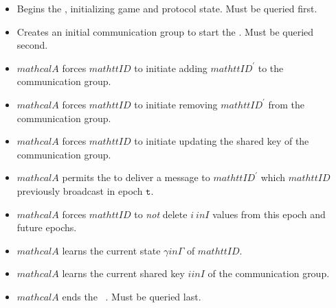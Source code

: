 \begin{itemize}

\item {}
Begins the \CGKAsec, initializing game and protocol state. Must be queried first.

\item {}
Creates an initial communication group to start the \CGKAsec. Must be queried second.

\item {}
\(mathcal{A}\) forces \(mathtt{ID}\) to initiate adding \(mathtt{ID}^{'}\) to the communication group.

\item {}
\(mathcal{A}\) forces \(mathtt{ID}\) to initiate removing \(mathtt{ID}^{'}\) from the communication group.

\item {}
\(mathcal{A}\) forces \(mathtt{ID}\) to initiate updating the shared key of the communication group.

\item {}
\(mathcal{A}\) permits the  to deliver a message to \(mathtt{ID}^{'}\) which \(mathtt{ID}\) previously broadcast in epoch \(\mathtt{t}\).

\item {}
\(mathcal{A}\) forces \(mathtt{ID}\) to \emph{not} delete \(i \ in I\) values from this epoch and future epochs.

\item {}
\(mathcal{A}\) learns the current state \(\gamma in \Gamma\) of \(mathtt{ID}\).

\item {}
\(mathcal{A}\) learns the current shared key \(i in I\) of the communication group.

\item {}
\(mathcal{A}\) ends the \CGKAsec\ . Must be queried last.

\end{itemize}

